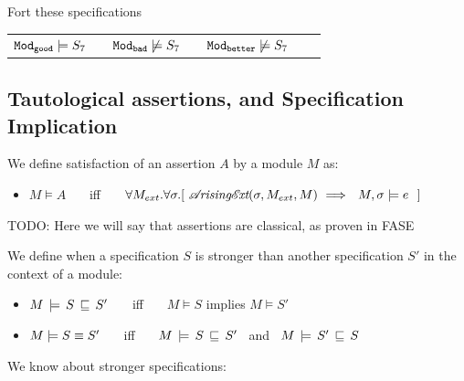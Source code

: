  \noindent
 Fort these specifications
 
 \begin{tabular}{lllllll}
${\texttt{Mod}}_{{\texttt{good}}}  \models S_7$  & & ${\texttt{Mod}}_{{\texttt{bad}}} \not\models S_7$ &&  ${\texttt{Mod}}_{{\texttt{better}}} \not\models S_7$ \\
\end{tabular}

\subsection{Tautological assertions, and Specification Implication}

\begin{definition} 
\label{def:assertion-inference-semantics}
We define satisfaction of an assertion $A$ by a  module $M$ as:
\begin{itemize}
\item
$M \vDash A$   \ \ \ iff \ \ \  $\forall M_{ext}. \forall \sigma.[\ \extArising{\sigma}{M_{ext}}{M} \ \Longrightarrow \ \ \satisfiesA{M}{\sigma}{e}\ \ ]$
\end{itemize}
\end{definition}

TODO: Here we will say that assertions are classical, as proven in FASE

\begin{definition} 
\label{def:specification-implication-semantics}
We define when a specification $S$ is stronger than another specification $S'$  in the context of a  module: 
 \begin{itemize}[itemsep=5pt]
\item 
$M\, \models\, S\, \sqsubseteq\, S'$   \ \ \ iff \ \ \  $M\models S$ implies $M \models S'$
\item
$M \models S  \equiv  S'$   \ \ \ iff \ \ \ $M\, \models\, S\, \sqsubseteq\, S'$  \ and \  $M\, \models\, S'\, \sqsubseteq\, S$    
\end{itemize}
\end{definition}

We know about stronger specifications:

